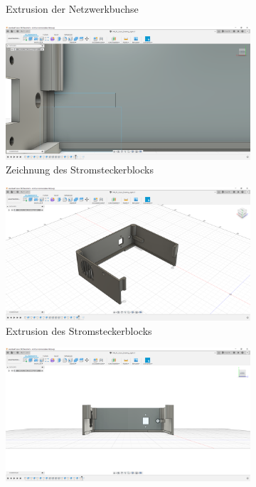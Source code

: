 \begin{figure}[H]
\begin{subfigure}[t]{.3\linewidth}
		\caption[Extrusion der Netzwerkbuchse]{Extrusion der Netzwerkbuchse}
		\label{fig:design-right-12}
	\end{subfigure}
	\begin{subfigure}[t]{.3\linewidth}
		\includegraphics[width=\linewidth]{img/konstruktion_gehaeuse_rechts_013.png}
		\caption[Zeichnung des Stromsteckerblocks]{Zeichnung des Stromsteckerblocks}
		\label{fig:design-right-13}
	\end{subfigure}
	\begin{subfigure}[t]{.3\linewidth}
		\includegraphics[width=\linewidth]{img/konstruktion_gehaeuse_rechts_014.png}
		\caption[Extrusion des Stromsteckerblocks]{Extrusion des Stromsteckerblocks}
		\label{fig:design-right-14}
	\end{subfigure}
	\begin{subfigure}[t]{.3\linewidth}
		\includegraphics[width=\linewidth]{img/konstruktion_gehaeuse_rechts_015.png}

\end{subfigure}
\end{figure}
